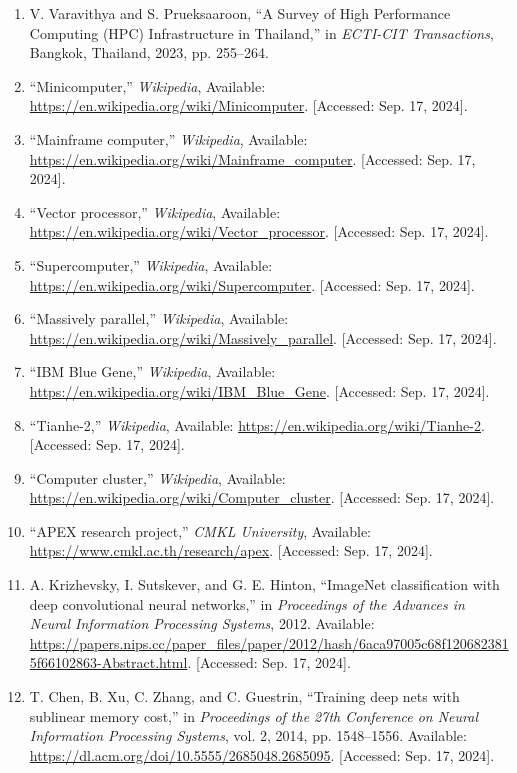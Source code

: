 \documentclass[a4paper,12pt]{extarticle}
\begin{document}
\begin{enumerate}
	\item V. Varavithya and S. Prueksaaroon, “A Survey of High Performance Computing (HPC) Infrastructure in Thailand,” in \textit{ECTI-CIT Transactions}, Bangkok, Thailand, 2023, pp. 255–264.
	\item “Minicomputer,” \textit{Wikipedia}, Available: \url{https://en.wikipedia.org/wiki/Minicomputer}. [Accessed: Sep. 17, 2024].
	\item “Mainframe computer,” \textit{Wikipedia}, Available: \url{https://en.wikipedia.org/wiki/Mainframe_computer}. [Accessed: Sep. 17, 2024].
	\item “Vector processor,” \textit{Wikipedia}, Available: \url{https://en.wikipedia.org/wiki/Vector_processor}. [Accessed: Sep. 17, 2024].
	\item “Supercomputer,” \textit{Wikipedia}, Available: \url{https://en.wikipedia.org/wiki/Supercomputer}. [Accessed: Sep. 17, 2024].
	\item “Massively parallel,” \textit{Wikipedia}, Available: \url{https://en.wikipedia.org/wiki/Massively_parallel}. [Accessed: Sep. 17, 2024].
	\item “IBM Blue Gene,” \textit{Wikipedia}, Available: \url{https://en.wikipedia.org/wiki/IBM_Blue_Gene}. [Accessed: Sep. 17, 2024].
	\item “Tianhe-2,” \textit{Wikipedia}, Available: \url{https://en.wikipedia.org/wiki/Tianhe-2}. [Accessed: Sep. 17, 2024].
	\item “Computer cluster,” \textit{Wikipedia}, Available: \url{https://en.wikipedia.org/wiki/Computer_cluster}. [Accessed: Sep. 17, 2024].
	\item “APEX research project,” \textit{CMKL University}, Available: \url{https://www.cmkl.ac.th/research/apex}. [Accessed: Sep. 17, 2024].
	\item A. Krizhevsky, I. Sutskever, and G. E. Hinton, “ImageNet classification with deep convolutional neural networks,” in \textit{Proceedings of the Advances in Neural Information Processing Systems}, 2012. Available: \url{https://papers.nips.cc/paper_files/paper/2012/hash/6aca97005c68f1206823815f66102863-Abstract.html}. [Accessed: Sep. 17, 2024].
	\item T. Chen, B. Xu, C. Zhang, and C. Guestrin, “Training deep nets with sublinear memory cost,” in \textit{Proceedings of the 27th Conference on Neural Information Processing Systems}, vol. 2, 2014, pp. 1548–1556. Available: \url{https://dl.acm.org/doi/10.5555/2685048.2685095}. [Accessed: Sep. 17, 2024].

\end{enumerate}
\end{document}

